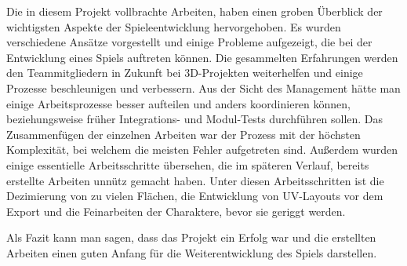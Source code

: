 Die in diesem Projekt vollbrachte Arbeiten, haben einen groben Überblick der wichtigsten Aspekte der Spieleentwicklung hervorgehoben.
Es wurden verschiedene Ansätze vorgestellt und einige Probleme aufgezeigt, die bei der Entwicklung eines Spiels auftreten können.
Die gesammelten Erfahrungen werden den Teammitgliedern in Zukunft bei 3D-Projekten weiterhelfen und einige Prozesse beschleunigen und verbessern.
Aus der Sicht des Management hätte man einige Arbeitsprozesse besser aufteilen und anders koordinieren können, beziehungsweise früher Integrations- und
Modul-Tests durchführen sollen. Das Zusammenfügen der einzelnen Arbeiten war der Prozess mit der höchsten Komplexität, bei welchem die meisten Fehler aufgetreten sind.
Außerdem wurden einige essentielle Arbeitsschritte übersehen, die im späteren Verlauf, bereits erstellte Arbeiten unnütz gemacht haben.
Unter diesen Arbeitsschritten ist die Dezimierung von zu vielen Flächen, die Entwicklung von UV-Layouts vor dem Export und die Feinarbeiten der Charaktere, bevor sie geriggt werden.

Als Fazit kann man sagen, dass das Projekt ein Erfolg war und die erstellten Arbeiten einen guten Anfang für die Weiterentwicklung des Spiels darstellen.